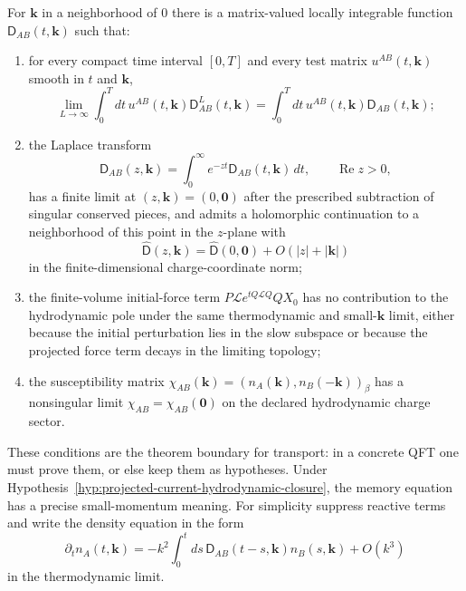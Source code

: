 \begin{hypothesis}
\label{hyp:projected-current-hydrodynamic-closure}
For \(\mathbf k\) in a neighborhood of \(0\) there is a matrix-valued
locally integrable function \(\mathsf D_{AB}(t,\mathbf k)\) such that:
\begin{enumerate}[label=(\roman*)]
  \item for every compact time interval \([0,T]\) and every test matrix
  \(u^{AB}(t,\mathbf k)\) smooth in \(t\) and \(\mathbf k\),
  \[
    \lim_{L\to\infty}
    \int_0^Tdt\,u^{AB}(t,\mathbf k)
    \mathsf D^L_{AB}(t,\mathbf k)
    =
    \int_0^Tdt\,u^{AB}(t,\mathbf k)
    \mathsf D_{AB}(t,\mathbf k);
  \]
  \item the Laplace transform
  \begin{equation}
    \widehat{\mathsf D}_{AB}(z,\mathbf k)
    =
    \int_0^\infty e^{-zt}\mathsf D_{AB}(t,\mathbf k)\,dt,
    \qquad \operatorname{Re}z>0,
    \label{eq:kubo-projected-memory-laplace}
  \end{equation}
  has a finite limit at \((z,\mathbf k)=(0,\mathbf0)\) after the prescribed
  subtraction of singular conserved pieces, and admits a holomorphic
  continuation to a neighborhood of this point in the \(z\)-plane with
  \[
    \widehat{\mathsf D}(z,\mathbf k)
    =
    \widehat{\mathsf D}(0,\mathbf0)+O(|z|+|\mathbf k|)
  \]
  in the finite-dimensional charge-coordinate norm;
  \item the finite-volume initial-force term
  \(P\mathcal L e^{tQ\mathcal LQ}QX_0\) has no contribution to the
  hydrodynamic pole under the same thermodynamic and small-\(\mathbf k\)
  limit, either because the initial perturbation lies in the slow subspace
  or because the projected force term decays in the limiting topology;
  \item the susceptibility matrix
  \(\chi_{AB}(\mathbf k)=
  (n_A(\mathbf k),n_B(-\mathbf k))_\beta\) has a nonsingular limit
  \(\chi_{AB}=\chi_{AB}(\mathbf0)\) on the declared hydrodynamic charge
  sector.
\end{enumerate}
\end{hypothesis}

These conditions are the theorem boundary for transport: in a concrete QFT
one must prove them, or else keep them as hypotheses.  Under
Hypothesis~\ref{hyp:projected-current-hydrodynamic-closure}, the memory
equation has a precise small-momentum meaning.  For simplicity suppress
reactive terms and write the density equation in the form
\begin{equation}
  \partial_t n_A(t,\mathbf k)
  =
  -k^2\int_0^t ds\,
  \mathsf D_{AB}(t-s,\mathbf k)n_B(s,\mathbf k)
  +O(k^3)
  \label{eq:kubo-projected-density-memory-equation}
\end{equation}
in the thermodynamic limit.

